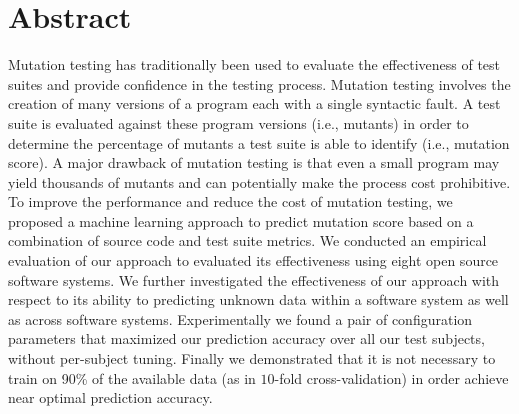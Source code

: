 \chapter*{Abstract}
Mutation testing has traditionally been used to evaluate the effectiveness of test suites and provide confidence in the testing process. Mutation testing involves the creation of many versions of a program each with a single syntactic fault. A test suite is evaluated against these program versions (i.e., mutants) in order to determine the percentage of mutants a test suite is able to identify (i.e., mutation score). A major drawback of mutation testing is that even a small program may yield thousands of mutants and can potentially make the process cost prohibitive. To improve the performance and reduce the cost of mutation testing, we proposed a machine learning approach to predict mutation score based on a combination of source code and test suite metrics. We conducted an empirical evaluation of our approach to evaluated its effectiveness using eight open source software systems. We further investigated the effectiveness of our approach with respect to its ability to predicting unknown data within a software system as well as across software systems. Experimentally we found a pair of configuration parameters that maximized our prediction accuracy over all our test subjects, without per-subject tuning. Finally we demonstrated that it is not necessary to train on 90\% of the available data (as in $10$-fold cross-validation) in order achieve near optimal prediction accuracy.
